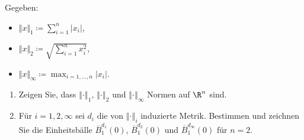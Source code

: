\newpage
\begin{assignment}
  Gegeben:
  \begin{itemize}
    \item \( \Vert x \Vert_1 \coloneqq \sum_{i = 1}^n \vert x_i \vert \),
    \item \( \Vert x \Vert_2 \coloneqq \sqrt{\sum_{i=1}^n x_i^2} \),
    \item \( \Vert x \Vert_\infty \coloneqq \max_{i = 1,\dots,n} \vert x_i \vert \).
  \end{itemize}
  \begin{enumerate}[label=(\alph*)]
    \item Zeigen Sie, dass \( \left\Vert \cdot \right\Vert_1 \), \( \left\Vert \cdot \right\Vert_2 \) und \( \left\Vert \cdot \right\Vert_\infty \) Normen auf \( \R^n \) sind.
    
    \item Für \( i = 1,2,\infty \) sei \( d_i \) die von \( \left\Vert \cdot \right\Vert_i \) induzierte Metrik. Bestimmen und zeichnen Sie die Einheitsbälle \( \overline{B}_1^{d_1}(0) \), \( \overline{B}_1^{d_2}(0) \) und \( \overline{B}_1^{d_\infty}(0) \) für \( n = 2 \).
  \end{enumerate}
\end{assignment}
